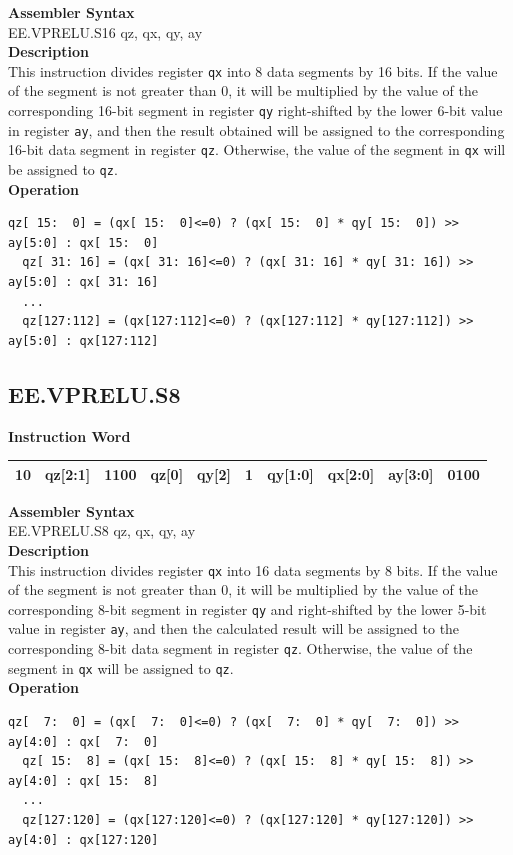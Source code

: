 \textbf{Assembler Syntax} \\
EE.VPRELU.S16 qz, qx, qy, ay \\
\textbf{Description} \\
This instruction divides register \lstinline{qx} into 8 data segments by 16 bits. If the value of the segment is not greater than 0, it will be multiplied by the value of the corresponding 16-bit segment in register \lstinline{qy} right-shifted by the lower 6-bit value in register \lstinline{ay}, and then the result obtained will be assigned to the corresponding 16-bit data segment in register \lstinline{qz}. Otherwise, the value of the segment in \lstinline{qx} will be assigned to \lstinline{qz}.\\
\textbf{Operation}
\begin{lstlisting}[escapeinside=`?]
  qz[ 15:  0] = (qx[ 15:  0]<=0) ? (qx[ 15:  0] * qy[ 15:  0]) >> ay[5:0] : qx[ 15:  0]
  qz[ 31: 16] = (qx[ 31: 16]<=0) ? (qx[ 31: 16] * qy[ 31: 16]) >> ay[5:0] : qx[ 31: 16]
  ...
  qz[127:112] = (qx[127:112]<=0) ? (qx[127:112] * qy[127:112]) >> ay[5:0] : qx[127:112]
\end{lstlisting}

\clearpage
\subsection{EE.VPRELU.S8}\label{instruction:EEVPRELUS8}
\setlength\tabcolsep{6pt}
\textbf{Instruction Word} \\
\begin{tabular}{|c|c|c|c|c|c|c|c|c|c|}
	\hline
	10 & qz[2:1] & 1100 & qz[0] & qy[2] & 1 & qy[1:0] & qx[2:0] & ay[3:0] & 0100 \\
	\hline
\end{tabular}

\textbf{Assembler Syntax} \\
EE.VPRELU.S8 qz, qx, qy, ay \\
\textbf{Description} \\
This instruction divides register \lstinline{qx} into 16 data segments by 8 bits. If the value of the segment is not greater than 0, it will be multiplied by the value of the corresponding 8-bit segment in register \lstinline{qy} and right-shifted by the lower 5-bit value in register \lstinline{ay}, and then the calculated result will be assigned to the corresponding 8-bit data segment in register \lstinline{qz}. Otherwise, the value of the segment in \lstinline{qx} will be assigned to \lstinline{qz}.\\
\textbf{Operation}
\begin{lstlisting}[escapeinside=`?]
  qz[  7:  0] = (qx[  7:  0]<=0) ? (qx[  7:  0] * qy[  7:  0]) >> ay[4:0] : qx[  7:  0]
  qz[ 15:  8] = (qx[ 15:  8]<=0) ? (qx[ 15:  8] * qy[ 15:  8]) >> ay[4:0] : qx[ 15:  8]
  ...
  qz[127:120] = (qx[127:120]<=0) ? (qx[127:120] * qy[127:120]) >> ay[4:0] : qx[127:120]
\end{lstlisting}

